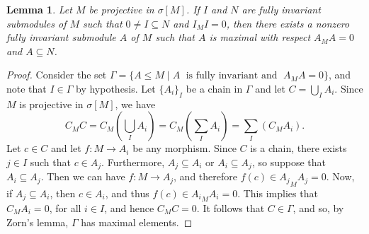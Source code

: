 \documentclass{amsart}
\newtheorem{thm}{Theorem}[section]
\newtheorem{lemma}[thm]{Lemma}
\newtheorem{cor}[thm]{Corollary}
\theoremstyle{definition}
\theoremstyle{remark}
\numberwithin{equation}{section}
\newcommand{\sm}{\sigma[M]}
\begin{document}
	\begin{lemma}\label{ObsPPnil}
		Let $M$ be projective in $\sm$. 
		If $I$ and $N$ are fully invariant submodules of $M$ 
		such that $0\neq I\subseteq N$ and $I_MI=0$, 
		then there exists a nonzero fully invariant submodule $A$ of $M$ 
		such that $A$ is maximal with respect $A_MA=0$ and $A\subseteq N$.
	\end{lemma}
	
	\begin{proof}
		Consider the set 
		$\Gamma=\{A\leq M\mid A\;\text{ is fully invariant and }\;A_MA=0\}$, 
		and note that $I\in\Gamma$ by hypothesis. 
		Let $\{A_i\}_I$ be a chain in $\Gamma$ and let $C=\bigcup_IA_i$. 
		Since $M$ is projective in $\sm$, we have
		\[\textstyle C_MC=C_M\left(\bigcup_IA_i\right)=C_M\left(\sum_IA_i\right)
		=\sum_I\left( C_MA_i\right).\]
		Let $c\in C$ and let $f:M\to A_i$ be any morphism. 
		Since $C$ is a chain, 
		there exists $j\in I$ such that $c\in A_j$. 
		Furthermore, $A_j\subseteq A_i$ or $A_i\subseteq A_j$, 
		so suppose that $A_i\subseteq A_j$. 
		Then we can have $f:M\to A_j$, 
		and therefore $f(c)\in {A_j}_MA_j=0$. 
		Now, if $A_j\subseteq A_i$, then $c\in A_i$, 
		and thus $f(c)\in {A_i}_MA_i=0$. 
		This implies that $C_MA_i=0$, for all $i\in I$, and hence $C_MC=0$. 
		It follows that $C\in \Gamma$, and so, by Zorn's lemma, 
		$\Gamma$ has maximal elements.
	\end{proof}
	
	
\end{document}
